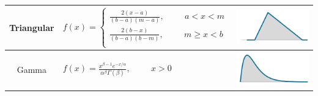 \documentclass[12pt]{article}
\begin{document}
\begin{table}
\begin{center}
\begin{tabular} {|c | l | c|}
  Triangular & $f(x)=
  \begin{cases}
  \frac{2(x-a)}{(b-a)(m-a)}, \hspace{1cm} a<x<m \\
  \frac{2(b-x)}{(b-a)(b-m)}, \hspace{1cm} m \geq x<b \\
  \end{cases}
  $ 
  & \begin{minipage}{3cm}\includegraphics[width=1\textwidth]{images/Triangular_dist.png} \end{minipage}\\  \hline
  
  \rule{0pt}{25pt} Gamma & $f(x)=\frac{x^{\beta-1}e^{-x/\alpha}}{\alpha^{\beta}\Gamma(\beta)}, \hspace{1cm} x>0$ & \begin{minipage}{3cm}\includegraphics[width=1\textwidth]{images/Gamma_dist.png} \end{minipage} \\  \hline
  

\end{tabular}
\end{center}
\end{table}
\end{document}
